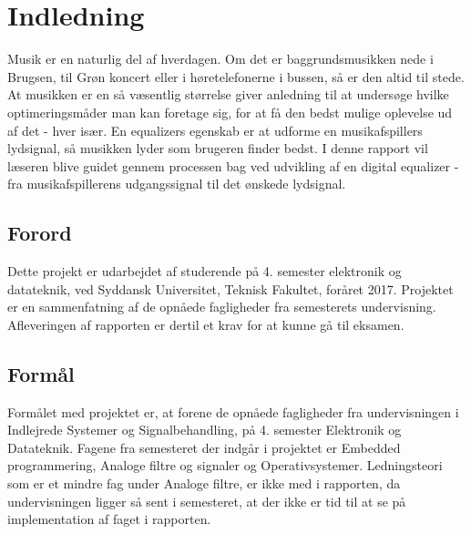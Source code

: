 \chapter{Indledning}
Musik er en naturlig del af hverdagen. Om det er baggrundsmusikken nede i Brugsen, til Grøn koncert eller i høretelefonerne i bussen, så er den altid til stede. At musikken er en så væsentlig størrelse giver anledning til at undersøge hvilke optimeringsmåder man kan foretage sig, for at få den bedst mulige oplevelse ud af det - hver især. En equalizers egenskab er at udforme en musikafspillers lydsignal, så musikken lyder som brugeren finder bedst.
I denne rapport vil læseren blive guidet gennem processen bag ved udvikling af en digital equalizer - fra musikafspillerens udgangssignal til det ønskede lydsignal.


\section{Forord}

Dette projekt er udarbejdet af studerende på 4. semester elektronik og datateknik, ved Syddansk Universitet, Teknisk Fakultet, foråret 2017. Projektet er en sammenfatning af de opnåede fagligheder fra semesterets undervisning. Afleveringen af rapporten er dertil et krav for at kunne gå til eksamen.




\section{Formål}

Formålet med projektet er, at forene de opnåede fagligheder fra undervisningen i Indlejrede Systemer og Signalbehandling, på 4. semester Elektronik og Datateknik. Fagene fra semesteret der indgår i projektet er Embedded programmering, Analoge filtre og signaler og Operativsystemer. Ledningsteori som er et mindre fag under Analoge filtre, er ikke med i rapporten, da undervisningen ligger så sent i semesteret, at der ikke er tid til at se på implementation af faget i rapporten.


